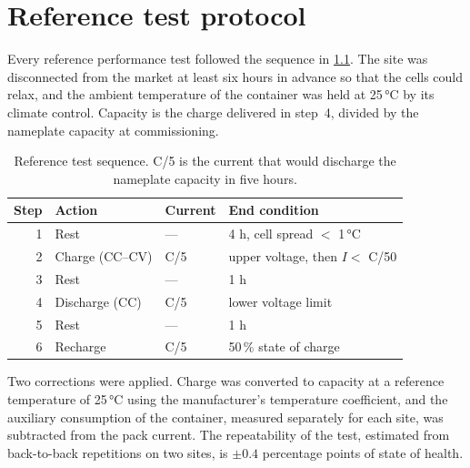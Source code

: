 \chapter{Reference test protocol}
\label{app:protocol}

Every reference performance test followed the sequence in
\cref{tab:protocol}. The site was disconnected from the market at least
six hours in advance so that the cells could relax, and the ambient
temperature of the container was held at 25\,°C by its climate control.
Capacity is the charge delivered in step~4, divided by the nameplate
capacity at commissioning.

\begin{table}[htb]
  \caption[Reference test sequence]{Reference test sequence. C/5 is the
    current that would discharge the nameplate capacity in five hours.}
  \label{tab:protocol}
  \centering
  \begin{tabular}{@{}r l l l@{}}
    \toprule
    Step & Action & Current & End condition \\
    \midrule
    1 & Rest            & ---      & 4 h, cell spread \(<\) 1\,°C \\
    2 & Charge (CC--CV) & C/5      & upper voltage, then \(I <\) C/50 \\
    3 & Rest            & ---      & 1 h \\
    4 & Discharge (CC)  & C/5      & lower voltage limit \\
    5 & Rest            & ---      & 1 h \\
    6 & Recharge        & C/5      & 50\,\% state of charge \\
    \bottomrule
  \end{tabular}
\end{table}

Two corrections were applied. Charge was converted to capacity at a
reference temperature of 25\,°C using the manufacturer's temperature
coefficient, and the auxiliary consumption of the container, measured
separately for each site, was subtracted from the pack current. The
repeatability of the test, estimated from back-to-back repetitions on
two sites, is \(\pm 0.4\) percentage points of state of health.
